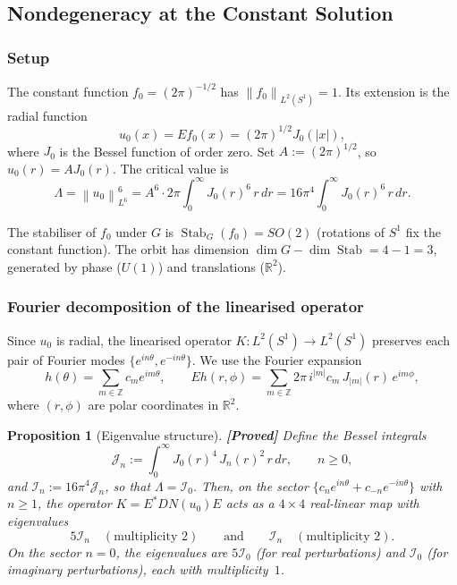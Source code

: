 \documentclass[12pt]{article}
\newtheorem{proposition}[theorem]{Proposition}
\theoremstyle{definition}
\theoremstyle{remark}
\DeclareMathOperator{\Stab}{Stab}
\newcommand{\R}{\mathbb{R}}
\newcommand{\Z}{\mathbb{Z}}
\newcommand{\norm}[1]{\left\|#1\right\|}
\newcommand{\proven}{\textbf{\color{teal}[Proved]}}
\begin{document}
\subsection{Nondegeneracy at the Constant Solution}
\label{sec:nondeg}

\subsubsection{Setup}

The constant function $f_0=(2\pi)^{-1/2}$ has $\norm{f_0}_{L^2(S^1)}=1$.
Its extension is the radial function
\[
  u_0(x) = Ef_0(x) = (2\pi)^{1/2}J_0(|x|),
\]
where $J_0$ is the Bessel function of order zero.  Set $A:=(2\pi)^{1/2}$, so
$u_0(r)=AJ_0(r)$.  The critical value is
\[
  \Lambda = \norm{u_0}_{L^6}^6
  = A^6\cdot 2\pi\int_0^\infty J_0(r)^6\,r\,dr
  = 16\pi^4\int_0^\infty J_0(r)^6\,r\,dr.
\]

The stabiliser of $f_0$ under $G$ is $\Stab_G(f_0)=SO(2)$ (rotations of
$S^1$ fix the constant function).  The orbit has dimension
$\dim G-\dim\Stab=4-1=3$, generated by phase ($U(1)$) and translations
($\R^2$).

\subsubsection{Fourier decomposition of the linearised operator}

Since $u_0$ is radial, the linearised operator
$K:L^2(S^1)\to L^2(S^1)$ preserves each pair of Fourier modes
$\{e^{in\theta},e^{-in\theta}\}$.  We use the Fourier expansion
\[
  h(\theta)=\sum_{m\in\Z}c_m e^{im\theta},
  \qquad
  Eh(r,\phi)=\sum_{m\in\Z} 2\pi\,i^{|m|}c_m\,J_{|m|}(r)\,e^{im\phi},
\]
where $(r,\phi)$ are polar coordinates in $\R^2$.

\begin{proposition}[Eigenvalue structure]
  \label{prop:eigenvalues}
  \proven\quad
  Define the Bessel integrals
  \begin{equation}  \label{eq:Jn-def}
    \mathcal J_n := \int_0^\infty J_0(r)^4\,J_n(r)^2\,r\,dr,
    \qquad n\geq 0,
  \end{equation}
  and $\mathcal I_n:=16\pi^4\mathcal J_n$, so that $\Lambda=\mathcal I_0$.
  Then, on the sector $\{c_ne^{in\theta}+c_{-n}e^{-in\theta}\}$ with
  $n\geq 1$, the operator $K=E^*DN(u_0)E$ acts as a $4\times 4$
  real-linear map with eigenvalues
  \[
    5\mathcal I_n\quad(\text{multiplicity }2)
    \qquad\text{and}\qquad
    \mathcal I_n\quad(\text{multiplicity }2).
  \]
  On the sector $n=0$, the eigenvalues are $5\mathcal I_0$ (for real
  perturbations) and $\mathcal I_0$ (for imaginary perturbations), each
  with multiplicity~$1$.
\end{proposition}
\end{document}
